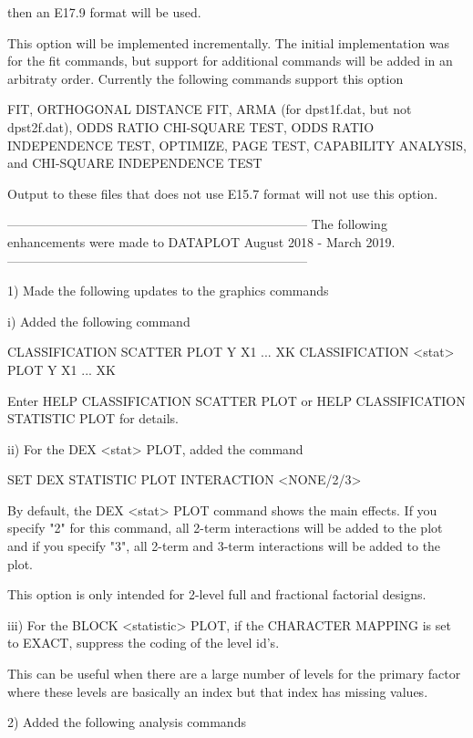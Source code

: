          then an E17.9 format will be used.

         This option will be implemented incrementally.  The initial
         implementation was for the fit commands, but support for
         additional commands will be added in an arbitraty order.
         Currently the following commands support this option

           FIT, ORTHOGONAL DISTANCE FIT, ARMA (for dpst1f.dat, but not
           dpst2f.dat), ODDS RATIO CHI-SQUARE TEST, ODDS RATIO
           INDEPENDENCE TEST, OPTIMIZE, PAGE TEST, CAPABILITY ANALYSIS,
           and CHI-SQUARE INDEPENDENCE TEST

         Output to these files that does not use E15.7 format will not
         use this option.

-----------------------------------------------------------------------
The following enhancements were made to DATAPLOT
August 2018 - March 2019.
-----------------------------------------------------------------------

 1) Made the following updates to the graphics commands

      i) Added the following command

           CLASSIFICATION SCATTER PLOT Y X1 ... XK
           CLASSIFICATION <stat> PLOT  Y X1 ... XK

         Enter HELP CLASSIFICATION SCATTER PLOT or
         HELP CLASSIFICATION STATISTIC PLOT for details.

     ii) For the DEX <stat> PLOT, added the command

            SET DEX STATISTIC PLOT INTERACTION <NONE/2/3>

         By default, the DEX <stat> PLOT command shows the main effects.
         If you specify "2" for this command, all 2-term interactions
         will be added to the plot and if you specify "3", all 2-term
         and 3-term interactions will be added to the plot.

         This option is only intended for 2-level full and fractional
         factorial designs.

    iii) For the BLOCK <statistic> PLOT, if the CHARACTER MAPPING
         is set to EXACT, suppress the coding of the level id's.

         This can be useful when there are a large number of levels
         for the primary factor where these levels are basically
         an index but that index has missing values.

 2) Added the following analysis commands

